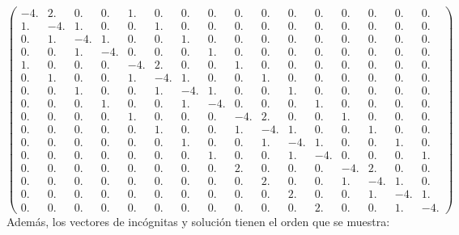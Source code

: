 \documentclass[12pt, notitlepage]{article}
\begin{document}
\begin{equation*}
\begin{pmatrix}
-4. &  2. &  0. &  0. &  1. &  0. &  0. &  0. &  0. &  0. &  0. &  0. &  0. &  0. &  0. &  0. \\
 1. & -4. &  1. &  0. &  0. &  1. &  0. &  0. &  0. &  0. &  0. &  0. &  0. &  0. &  0. &  0. \\
 0. &  1. & -4. &  1. &  0. &  0. &  1. &  0. &  0. &  0. &  0. &  0. &  0. &  0. &  0. &  0. \\
 0. &  0. &  1. & -4. &  0. &  0. &  0. &  1. &  0. &  0. &  0. &  0. &  0. &  0. &  0. &  0. \\
 1. &  0. &  0. &  0. & -4. &  2. &  0. &  0. &  1. &  0. &  0. &  0. &  0. &  0. &  0. &  0. \\
 0. &  1. &  0. &  0. &  1. & -4. &  1. &  0. &  0. &  1. &  0. &  0. &  0. &  0. &  0. &  0. \\
 0. &  0. &  1. &  0. &  0. &  1. & -4. &  1. &  0. &  0. &  1. &  0. &  0. &  0. &  0. &  0. \\
 0. &  0. &  0. &  1. &  0. &  0. &  1. & -4. &  0. &  0. &  0. &  1. &  0. &  0. &  0. &  0. \\
 0. &  0. &  0. &  0. &  1. &  0. &  0. &  0. & -4. &  2. &  0. &  0. &  1. &  0. &  0. &  0. \\
 0. &  0. &  0. &  0. &  0. &  1. &  0. &  0. &  1. & -4. &  1. &  0. &  0. &  1. &  0. &  0. \\
 0. &  0. &  0. &  0. &  0. &  0. &  1. &  0. &  0. &  1. & -4. &  1. &  0. &  0. &  1. &  0. \\
 0. &  0. &  0. &  0. &  0. &  0. &  0. &  1. &  0. &  0. &  1. & -4. &  0. &  0. &  0. &  1. \\
 0. &  0. &  0. &  0. &  0. &  0. &  0. &  0. &  2. &  0. &  0. &  0. & -4. &  2. &  0. &  0. \\
 0. &  0. &  0. &  0. &  0. &  0. &  0. &  0. &  0. &  2. &  0. &  0. &  1. & -4. &  1. &  0. \\
 0. &  0. &  0. &  0. &  0. &  0. &  0. &  0. &  0. &  0. &  2. &  0. &  0. &  1. & -4. &  1. \\
 0. &  0. &  0. &  0. &  0. &  0. &  0. &  0. &  0. &  0. &  0. &  2. &  0. &  0. &  1. & -4.
\end{pmatrix}
\end{equation*}
Además, los vectores de incógnitas y solución tienen el orden que se muestra:\\
\end{document}
